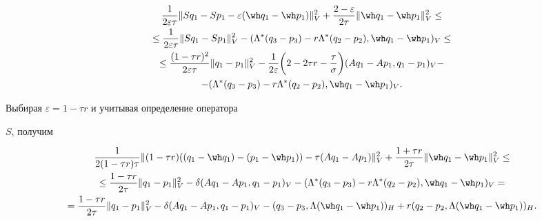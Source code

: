 \begin{pf}
\begin{multline*}


\frac {1}{2 \varepsilon \tau} \| {S q_1-S p_1}-\varepsilon ({\wh q_1-\wh p_1}) \|_V^2


+\frac {2-\varepsilon} {2 \tau} \| {\wh q_1-\wh p_1} \|_V^2 \leq \\


%


\leq \frac {1} {2 \varepsilon \tau} \| {S q_1-S p_1} \|_V^2 -


 ({\Lambda ^* (q_3-p_3)-r \Lambda ^* (q_2- p_2), \wh q_1-\wh p_1})_V \leq \\


%


\leq \frac {(1-\tau r)^2} {2 \varepsilon \tau} \| {q_1-p_1} \|_V^2 -


\frac {1} {2 \varepsilon} \bigg(2-2 \tau r-\frac {\tau} {\sigma} \bigg) 


 (A q_1-A p_1, q_1-p_1)_V -\\


%


- ({\Lambda ^* (q_3-p_3)-r \Lambda ^* (q_2- p_2), \wh q_1-\wh p_1})_V .


\end{multline*}


Выбирая $\varepsilon=1-\tau r$ и учитывая определение оператора


$S$, получим


\begin{multline}


\frac {1}{2 (1-\tau r) \tau} \| (1-\tau r) ((q_1 -\wh q_1)- (p_1- \wh p_1))


- \tau (A q_1- A p_1) \|_V^2+


\frac {1+\tau r} {2 \tau} \| {\wh q_1-\wh p_1} \|_V^2 \leq \\


%


\leq \frac {1-\tau r} {2 \tau} \| {q_1-p_1} \|_V^2-


 \delta (A q_1-A p_1, q_1-p_1)_V-


 ({\Lambda ^* (q_3-p_3)-r \Lambda ^* (q_2- p_2), \wh q_1-\wh p_1})_V=\\


%


= \frac {1-\tau r} {2 \tau} \| {q_1-p_1} \|_V^2-


 \delta (A q_1-A p_1, q_1-p_1)_V -


({q_3-p_3, \Lambda (\wh q_1-\wh p_1)})_H


+ r ({q_2-p_2, \Lambda (\wh q_1-\wh p_1)})_H.



\end{multline}
\end{pf}

